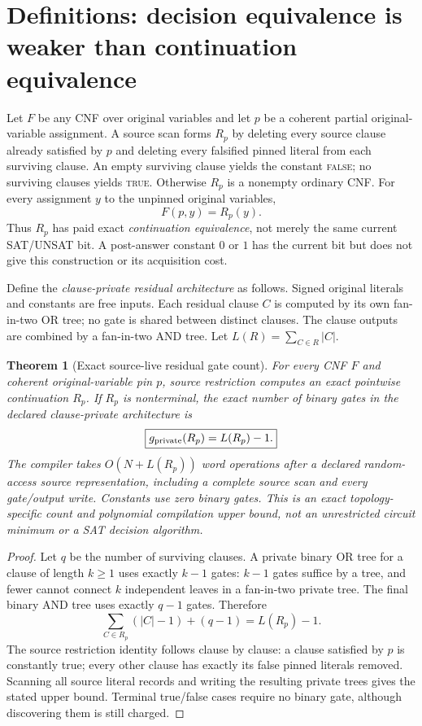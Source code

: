 \documentclass[11pt]{article}
\newtheorem{theorem}{Theorem}
\begin{document}
\section{Definitions: decision equivalence is weaker than continuation equivalence}
Let $F$ be any CNF over original variables and let $p$ be a coherent partial original-variable assignment. A source scan forms $R_p$ by deleting every source clause already satisfied by $p$ and deleting every falsified pinned literal from each surviving clause. An empty surviving clause yields the constant \textsc{false}; no surviving clauses yields \textsc{true}. Otherwise $R_p$ is a nonempty ordinary CNF. For every assignment $y$ to the unpinned original variables,
\[
 F(p,y)=R_p(y).
\]
Thus $R_p$ has paid exact \emph{continuation equivalence}, not merely the same current SAT/UNSAT bit. A post-answer constant $0$ or $1$ has the current bit but does not give this construction or its acquisition cost.

Define the \emph{clause-private residual architecture} as follows. Signed original literals and constants are free inputs. Each residual clause $C$ is computed by its own fan-in-two OR tree; no gate is shared between distinct clauses. The clause outputs are combined by a fan-in-two AND tree. Let $L(R)=\sum_{C\in R}|C|$.

\begin{theorem}[Exact source-live residual gate count]
For every CNF $F$ and coherent original-variable pin $p$, source restriction computes an exact pointwise continuation $R_p$. If $R_p$ is nonterminal, the exact number of binary gates in the declared clause-private architecture is
\[
 \boxed{g_{\rm private}(R_p)=L(R_p)-1.}
\]
The compiler takes $O(N+L(R_p))$ word operations after a declared random-access source representation, including a complete source scan and every gate/output write. Constants use zero binary gates. This is an exact topology-specific count and polynomial compilation upper bound, not an unrestricted circuit minimum or a SAT decision algorithm.
\end{theorem}
\begin{proof}
Let $q$ be the number of surviving clauses. A private binary OR tree for a clause of length $k\ge1$ uses exactly $k-1$ gates: $k-1$ gates suffice by a tree, and fewer cannot connect $k$ independent leaves in a fan-in-two private tree. The final binary AND tree uses exactly $q-1$ gates. Therefore
\[
 \sum_{C\in R_p}(|C|-1)+(q-1)=L(R_p)-1.
\]
The source restriction identity follows clause by clause: a clause satisfied by $p$ is constantly true; every other clause has exactly its false pinned literals removed. Scanning all source literal records and writing the resulting private trees gives the stated upper bound. Terminal true/false cases require no binary gate, although discovering them is still charged.
\end{proof}
\end{document}
